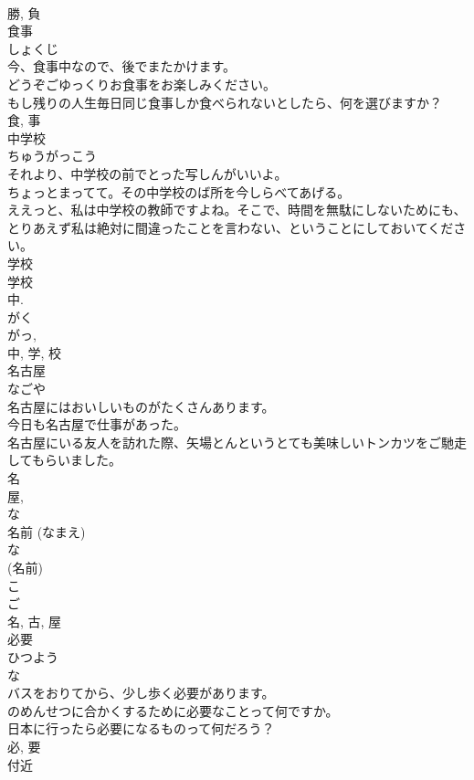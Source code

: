 \documentclass[8pt]{extreport}
\begin{document}
\begin{CJK}{UTF8}{min}
\\	勝, 負	
\\	食事	
\\	しょくじ	
\\	今、食事中なので、後でまたかけます。	
\\	どうぞごゆっくりお食事をお楽しみください。	
\\	もし残りの人生毎日同じ食事しか食べられないとしたら、何を選びますか？	
\\	食, 事	
\\	中学校	
\\	ちゅうがっこう	
\\	それより、中学校の前でとった写しんがいいよ。	
\\	ちょっとまってて。その中学校のば所を今しらべてあげる。	
\\	ええっと、私は中学校の教師ですよね。そこで、時間を無駄にしないためにも、とりあえず私は絶対に間違ったことを言わない、ということにしておいてください。	
\\	学校 
\\	学校 
\\	中. 
\\	がく 
\\	がっ, 
\\	中, 学, 校	
\\	名古屋	
\\	なごや	
\\	名古屋にはおいしいものがたくさんあります。	
\\	今日も名古屋で仕事があった。	
\\	名古屋にいる友人を訪れた際、矢場とんというとても美味しいトンカツをご馳走してもらいました。	
\\	名 
\\	屋, 
\\	な 
\\	名前 (なまえ) 
\\	な 
\\	(名前) 
\\	こ 
\\	ご 
\\	名, 古, 屋	
\\	必要	
\\	ひつよう	
\\	な 
\\	バスをおりてから、少し歩く必要があります。	
\\	のめんせつに合かくするために必要なことって何ですか。	
\\	日本に行ったら必要になるものって何だろう？	
\\	必, 要	
\\	付近	

\end{CJK}
\end{document}
